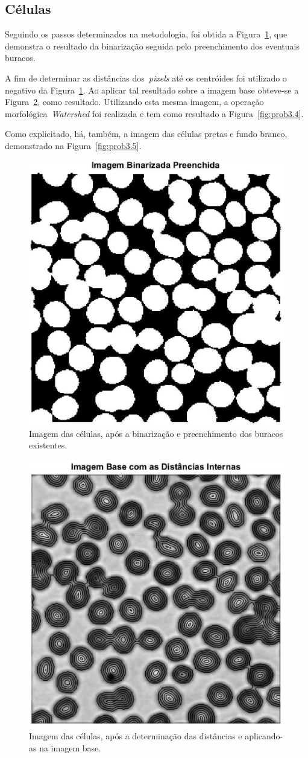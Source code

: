 \documentclass[conference]{Trabalho_2}
\begin{document}
\subsection{C\'elulas}
Seguindo os passos determinados na metodologia, foi obtida a Figura~\ref{fig:prob3.2}, que demonstra o resultado da binariza\c{c}\~ao seguida pelo preenchimento dos eventuais buracos.

A fim de determinar as dist\^ancias dos~\textit{pixels} at\'e os centr\'oides foi utilizado o negativo da Figura~\ref{fig:prob3.2}. Ao aplicar tal resultado sobre a imagem base obteve-se a Figura~\ref{fig:prob3.3}, como resultado. Utilizando esta mesma imagem, a opera\c{c}\~ao morfol\'ogica~\textit{Watershed} foi realizada e tem como resultado a Figura~\ref{fig:prob3.4}.

Como explicitado, h\'a, tamb\'em, a imagem das c\'elulas pretas e fundo branco, demonstrado na Figura~\ref{fig:prob3.5}.

\begin{figure}[!t]
  \centering
  \includegraphics[width = 4.5 cm]{Imagem_Binarizada_Preenchida}
  \caption{Imagem das c\'elulas, ap\'os a binariza\c{c}\~ao e preenchimento dos buracos existentes.}
  \label{fig:prob3.2}
\end{figure}

\begin{figure}[!t]
  \centering
  \includegraphics[width = 4.5 cm]{Imagem_Base_com_as_Dist_ncias_Internas_}
  \caption{Imagem das c\'elulas, ap\'os a determina\c{c}\~ao das dist\^ancias e aplicando-as na imagem base.}
  \label{fig:prob3.3}
\end{figure}
\end{document}
